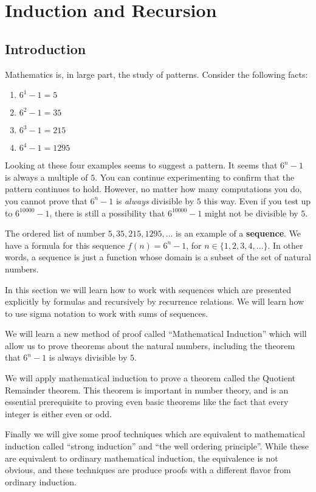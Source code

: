 \chapter{Induction and Recursion}

\section{Introduction}

Mathematics is, in large part, the study of patterns.  Consider the following facts:

\begin{enumerate}
		\item $6^1 - 1 = 5$
		\item $6^2 - 1 = 35$
		\item $6^3 -1 = 215$
		\item $6^4 - 1 = 1295$
	\end{enumerate}

Looking at these four examples seems to suggest a pattern.  It seems that $6^n - 1$ is always a multiple of $5$.  You can continue experimenting to confirm that the pattern continues to hold.  However, no matter how many computations you do, you cannot prove that $6^n-1$ is \textit{always} divisible by $5$ this way.  Even if you test up to $6^{10000} - 1$, there is still a possibility that $6^{10000} - 1$ might not be divisible by $5$.

The ordered list of number $5, 35, 215, 1295, \dots$ is an example of a \textbf{sequence}.  We have a formula for this sequence $f(n) = 6^n -1$, for $n \in \{1,2,3,4, \dots\}$.  In other words, a sequence is just a function whose domain is a subset of the set of natural numbers.

In this section we will learn how to work with sequences which are presented explicitly by formulas and recursively by recurrence relations.  We will learn how to use sigma notation to work with sums of sequences.

We will learn a new method of proof called ``Mathematical Induction'' which will allow us to prove theorems about the natural numbers, including the theorem that $6^n - 1$ is always divisible by $5$.

We will apply mathematical induction to prove a theorem called the Quotient Remainder theorem.  This theorem is important in number theory, and is an essential prerequisite to proving even basic theorems like the fact that every integer is either even or odd.

Finally we will give some proof techniques which are equivalent to mathematical induction called ``strong induction'' and ``the well ordering principle''.  While these are equivalent to ordinary mathematical induction, the equivalence is not obvious, and these techniques are produce proofs with a different flavor from ordinary induction.

